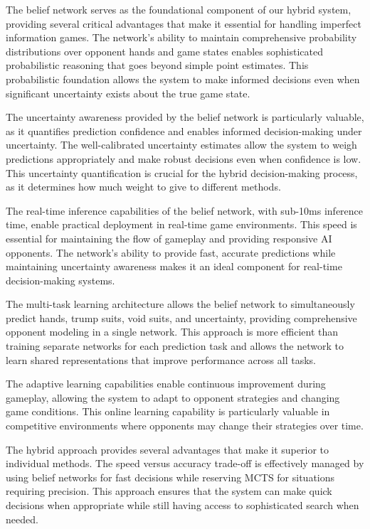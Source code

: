 \documentclass[conference]{IEEEtran}
\begin{document}
The belief network serves as the foundational component of our hybrid system, providing several critical advantages that make it essential for handling imperfect information games. The network's ability to maintain comprehensive probability distributions over opponent hands and game states enables sophisticated probabilistic reasoning that goes beyond simple point estimates. This probabilistic foundation allows the system to make informed decisions even when significant uncertainty exists about the true game state.

The uncertainty awareness provided by the belief network is particularly valuable, as it quantifies prediction confidence and enables informed decision-making under uncertainty. The well-calibrated uncertainty estimates allow the system to weigh predictions appropriately and make robust decisions even when confidence is low. This uncertainty quantification is crucial for the hybrid decision-making process, as it determines how much weight to give to different methods.

The real-time inference capabilities of the belief network, with sub-10ms inference time, enable practical deployment in real-time game environments. This speed is essential for maintaining the flow of gameplay and providing responsive AI opponents. The network's ability to provide fast, accurate predictions while maintaining uncertainty awareness makes it an ideal component for real-time decision-making systems.

The multi-task learning architecture allows the belief network to simultaneously predict hands, trump suits, void suits, and uncertainty, providing comprehensive opponent modeling in a single network. This approach is more efficient than training separate networks for each prediction task and allows the network to learn shared representations that improve performance across all tasks.

The adaptive learning capabilities enable continuous improvement during gameplay, allowing the system to adapt to opponent strategies and changing game conditions. This online learning capability is particularly valuable in competitive environments where opponents may change their strategies over time.

The hybrid approach provides several advantages that make it superior to individual methods. The speed versus accuracy trade-off is effectively managed by using belief networks for fast decisions while reserving MCTS for situations requiring precision. This approach ensures that the system can make quick decisions when appropriate while still having access to sophisticated search when needed.
\end{document}
